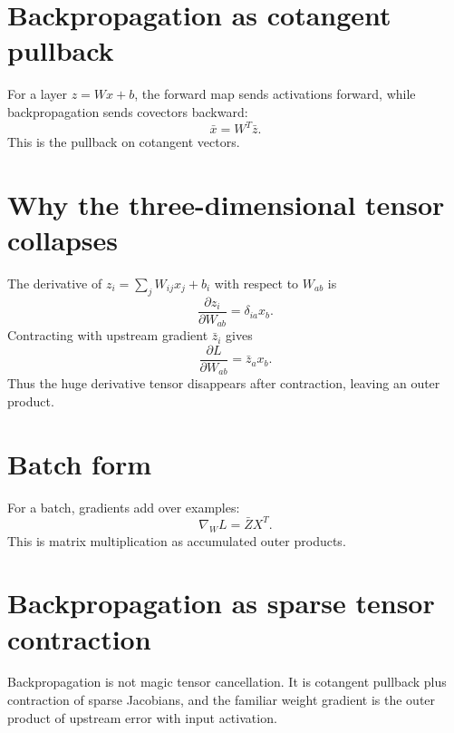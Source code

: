 \section{Backpropagation as cotangent pullback}
For a layer \(z=Wx+b\), the forward map sends activations forward, while backpropagation sends covectors backward:
\[
\bar x=W^T\bar z.
\]
This is the pullback on cotangent vectors.
\section{Why the three-dimensional tensor collapses}
The derivative of \(z_i=\sum_j W_{ij}x_j+b_i\) with respect to \(W_{ab}\) is
\[
\frac{\partial z_i}{\partial W_{ab}}=\delta_{ia}x_b.
\]
Contracting with upstream gradient \(\bar z_i\) gives
\[
\frac{\partial L}{\partial W_{ab}}=\bar z_a x_b.
\]
Thus the huge derivative tensor disappears after contraction, leaving an outer product.
\section{Batch form}
For a batch, gradients add over examples:
\[
\nabla_W L=\bar Z X^T.
\]
This is matrix multiplication as accumulated outer products.
\section{Backpropagation as sparse tensor contraction}
Backpropagation is not magic tensor cancellation.  It is cotangent pullback plus contraction of sparse Jacobians, and the familiar weight gradient is the outer product of upstream error with input activation.
